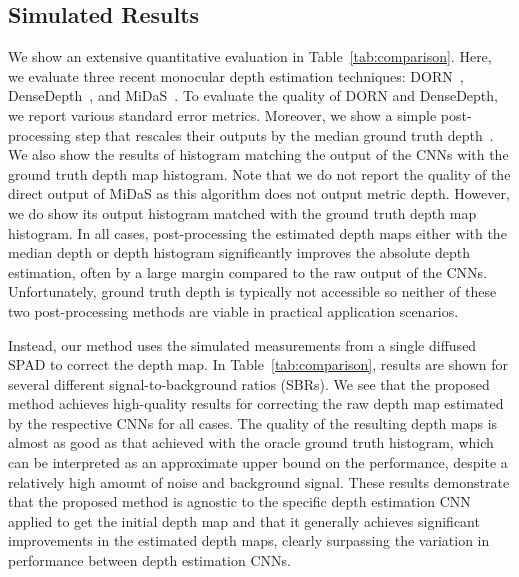 
\subsection{Simulated Results}

We show an extensive quantitative evaluation in Table~\ref{tab:comparison}.
Here, we evaluate three recent monocular depth estimation techniques:
DORN~\cite{Fu2018}, DenseDepth~\cite{Alhashim2018}, and
MiDaS~\cite{Lasinger:2019}. To evaluate the quality of DORN and DenseDepth, we
report various standard error metrics. Moreover, we show a simple
post-processing step that rescales their outputs by the median ground truth
depth~\cite{Alhashim2018}. We also show the results of histogram matching the
output of the CNNs with the ground truth depth map histogram. Note that we do
not report the quality of the direct output of MiDaS as this algorithm does not
output metric depth. However, we do show its output histogram matched with the
ground truth depth map histogram. In all cases, post-processing the estimated
depth maps either with the median depth or depth histogram significantly
improves the absolute depth estimation, often by a large margin compared to the
raw output of the CNNs. Unfortunately, ground truth depth is typically not
accessible so neither of these two post-processing methods are viable in
practical application scenarios.

Instead, our method uses the simulated measurements from a single diffused SPAD
to correct the depth map. In Table~\ref{tab:comparison}, results are shown for several different
signal-to-background ratios (SBRs). We see that the proposed method achieves
high-quality results for correcting the raw depth map estimated by the
respective CNNs for all cases. The quality of the resulting depth maps is almost
as good as that achieved with the oracle ground truth histogram, which can be
interpreted as an approximate upper bound on the performance, despite a
relatively high amount of noise and background signal. These results demonstrate
that the proposed method is agnostic to the specific depth estimation CNN
applied to get the initial depth map and that it generally achieves significant
improvements in the estimated depth maps, clearly surpassing the variation in
performance between depth estimation CNNs.


